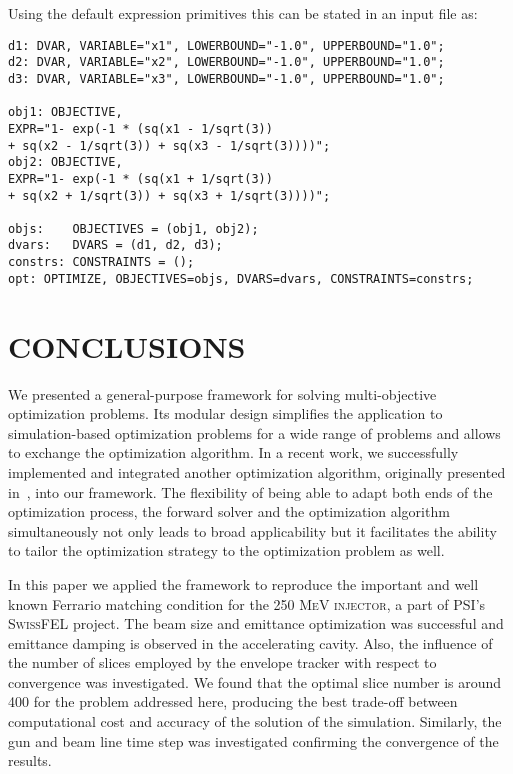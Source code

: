 \documentclass[%
reprint,
amsmath,amssymb,
aps,
]{revtex4-1}
\begin{document}
%
Using the default expression primitives this can be stated in an input file
  as:
%

\begin{flushleft}
\begin{Verbatim}[fontsize=\scriptsize]
d1: DVAR, VARIABLE="x1", LOWERBOUND="-1.0", UPPERBOUND="1.0";
d2: DVAR, VARIABLE="x2", LOWERBOUND="-1.0", UPPERBOUND="1.0";
d3: DVAR, VARIABLE="x3", LOWERBOUND="-1.0", UPPERBOUND="1.0";

obj1: OBJECTIVE,
EXPR="1- exp(-1 * (sq(x1 - 1/sqrt(3)) 
+ sq(x2 - 1/sqrt(3)) + sq(x3 - 1/sqrt(3))))";
obj2: OBJECTIVE,
EXPR="1- exp(-1 * (sq(x1 + 1/sqrt(3)) 
+ sq(x2 + 1/sqrt(3)) + sq(x3 + 1/sqrt(3))))";

objs:    OBJECTIVES = (obj1, obj2);
dvars:   DVARS = (d1, d2, d3);
constrs: CONSTRAINTS = ();
opt: OPTIMIZE, OBJECTIVES=objs, DVARS=dvars, CONSTRAINTS=constrs;
\end{Verbatim}
\end{flushleft}






\section{CONCLUSIONS} \label{sec:conclusions}

We presented a general-purpose framework for solving multi-objective
  optimization problems.
Its modular design simplifies the application to simulation-based optimization
  problems for a wide range of problems and allows to exchange the
  optimization algorithm.
In a recent work, we successfully implemented and integrated another
  optimization algorithm, originally presented in~\cite{pesc:11}, into our
  framework.
The flexibility of being able to adapt both ends of the optimization
  process, the forward solver and the optimization algorithm simultaneously
  not only leads to broad applicability but it facilitates the ability to
  tailor the optimization strategy to the optimization problem as well.

In this paper we applied the framework to reproduce the important and well
  known Ferrario matching condition for the \textsc{250 MeV injector}, a part of PSI's
  \textsc{SwissFEL} project.
The beam size and emittance optimization was successful and emittance damping
  is observed in the accelerating cavity.
Also, the influence of the number of slices employed by the envelope tracker
  with respect to convergence was investigated.
We found that the optimal slice number is around 400 for the problem addressed
  here, producing the best trade-off between computational cost and accuracy
  of the solution of the simulation.
Similarly, the gun and beam line time step was investigated confirming the
  convergence of the results.
\end{document}
